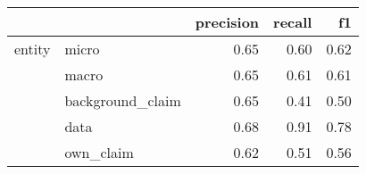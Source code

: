 \begin{tabular}{llrrr}
\toprule
       &           &  precision &  recall &   f1 \\
\midrule
entity & micro &       0.65 &    0.60 & 0.62 \\
       & macro &       0.65 &    0.61 & 0.61 \\
       & background\_claim &       0.65 &    0.41 & 0.50 \\
       & data &       0.68 &    0.91 & 0.78 \\
       & own\_claim &       0.62 &    0.51 & 0.56 \\
\bottomrule
\end{tabular}
